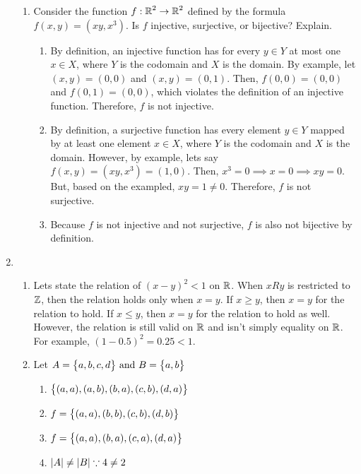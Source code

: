 \begin{enumerate}
\begin{enumerate}[label=(\alph*), itemsep=10pt]
              \item Consider the function $f: \operatorname{\mathbb{R}}^2 \to \operatorname{\mathbb{R}}^2$ defined by the formula $f(x,y) = (xy, x^3)$. Is $f$ injective, surjective, or bijective? Explain.
                    \begin{enumerate}
                        \item By definition, an injective function has for every $y \in Y$ at most one $x \in X$, where $Y$ is the codomain and $X$ is the domain. By example, let $(x,y) = (0,0)$ and $(x,y) = (0,1)$. Then, $f(0,0) = (0,0)$ and $f(0,1) = (0,0)$, which violates the definition of an injective function. Therefore, $f$ is not injective.
                        \item By definition, a surjective function has every element $y \in Y$ mapped by at least one element $x \in X$, where $Y$ is the codomain and $X$ is the domain. However, by example, lets say $f(x,y) = (xy, x^3) = (1, 0)$. Then, $x^3 = 0 \implies x = 0 \implies xy = 0$. But, based on the exampled, $xy = 1 \neq 0$. Therefore, $f$ is not surjective.
                        \item Because $f$ is not injective and not surjective, $f$ is also not bijective by definition.
                    \end{enumerate}
          \end{enumerate}
    \item
          \begin{enumerate}[label=(\alph*), itemsep=10pt]
              \item Lets state the relation of $(x - y)^2 < 1$ on $\operatorname{\mathbb{R}}$. When $xRy$ is restricted to $\operatorname{\mathbb{Z}}$, then the relation holds only when $x = y$. If $x \ge y$, then $x = y$ for the relation to hold. If $x \le y$, then $x = y$ for the relation to hold as well. However, the relation is still valid on $\operatorname{\mathbb{R}}$ and isn't simply equality on $\operatorname{\mathbb{R}}$. For example, $(1 - 0.5)^2 = 0.25 < 1$.
              \item Let $A = \bigl\{ {a,b,c,d} \bigr\} \text{ and } B=\bigl\{ {a,b} \bigr\}$
                    \begin{enumerate}
                        \item $\bigl\{ {(a,a),(a,b),(b,a),(c,b),(d,a)} \bigr\}$
                        \item $f = \bigl\{ {(a,a),(b,b),(c,b),(d,b)} \bigr\}$
                        \item $f = \bigl\{ {(a,a),(b,a),(c,a),(d,a)} \bigr\}$
                        \item $\lvert {A} \rvert \neq \lvert {B} \rvert \because {4 \neq 2}$
                    \end{enumerate}
          \end{enumerate}
\end{enumerate}

